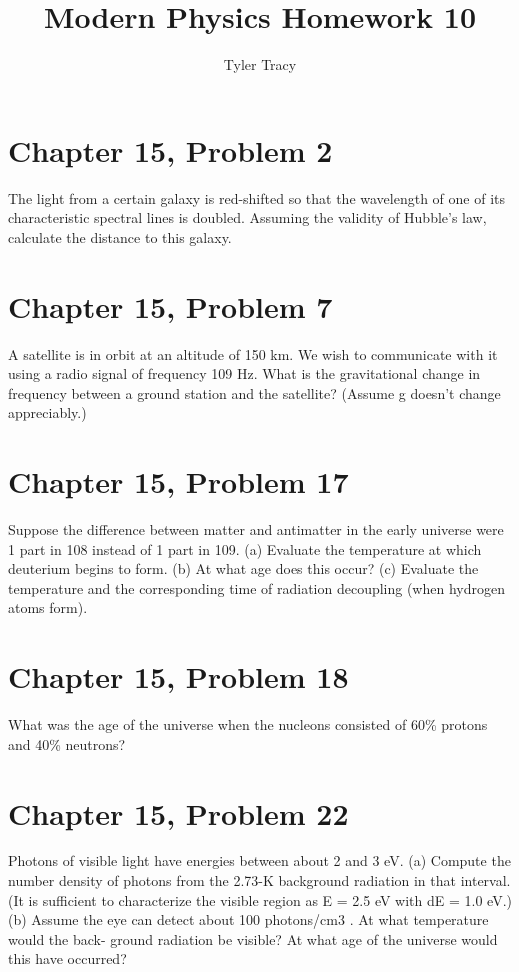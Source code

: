 \documentclass[12pt]{article}
\title{Modern Physics Homework 10}
\author{Tyler Tracy}
\begin{document}
\maketitle

\section*{Chapter 15, Problem 2}

The light from a certain galaxy is red-shifted so that the wavelength of one of its characteristic spectral lines is doubled. Assuming the validity of Hubble's law, calculate the distance to this galaxy.

\section*{Chapter 15, Problem 7}

A satellite is in orbit at an altitude of 150 km. We wish to communicate with it using a radio signal of frequency 109 Hz. What is the gravitational change in frequency between a ground station and the satellite? (Assume g doesn't change appreciably.)

\section*{Chapter 15, Problem 17}

Suppose the difference between matter and antimatter in the early universe were 1 part in 108 instead of 1 part in 109.  (a) Evaluate the temperature at which deuterium begins to form. (b) At what age does this occur? (c) Evaluate the temperature and the corresponding time of radiation decoupling (when hydrogen atoms form).

\section*{Chapter 15, Problem 18}

What was the age of the universe when the nucleons consisted of 60\% protons and 40\% neutrons?

\section*{Chapter 15, Problem 22}

Photons of visible light have energies between about 2 and 3 eV.
(a) Compute the number density of photons from the 2.73-K background radiation in that interval. (It is sufficient to characterize the visible region as E = 2.5 eV with dE = 1.0 eV.)
(b) Assume the eye can detect about 100 photons/cm3 . At what temperature would the back- ground radiation be visible? At what age of the universe would this have occurred?
\end{document}
